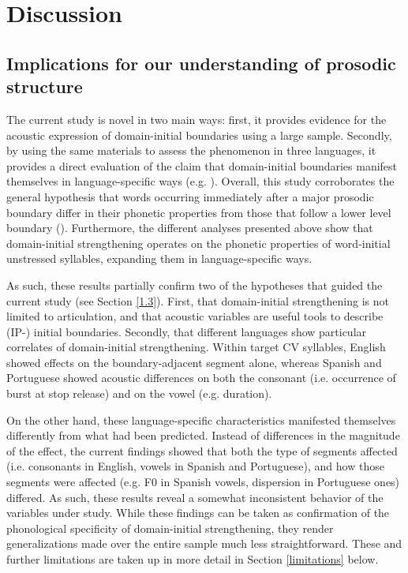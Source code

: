 \documentclass[output=paper]{langscibook}
\begin{document}
\section{Discussion}
\subsection{Implications for our understanding of prosodic structure}
The current study is novel in two main ways: first, it provides evidence for the acoustic expression of domain-initial boundaries using a large sample. Secondly, by using the same materials to assess the phenomenon in three languages, it provides a direct evaluation of the claim that domain-initial boundaries manifest themselves in language-specific ways (e.g. \citealt{cm05}). Overall, this study corroborates the general hypothesis that words occurring immediately after a major prosodic boundary differ in their phonetic properties from those that follow a lower level boundary (\citealt{fk97}). Furthermore, the different analyses presented above show that domain-initial strengthening operates on the phonetic properties of word-initial unstressed syllables, expanding them in language-specific ways. 

As such, these results partially confirm two of the hypotheses that guided the current study (see Section \ref{1.3}). First, that domain-initial strengthening is not limited to articulation, and that acoustic variables are useful tools to describe (IP-) initial boundaries. Secondly, that different languages show particular correlates of domain-initial strengthening. Within target CV syllables, English showed effects on the boundary-adjacent segment alone, whereas Spanish and Portuguese showed acoustic differences on both the consonant (i.e. occurrence of burst at stop release) and on the vowel (e.g. duration).

On the other hand, these language-specific characteristics manifested themselves differently from what had been predicted. Instead of differences in the magnitude of the effect, the current findings showed that both the type of segments affected (i.e. consonants in English, vowels in Spanish and Portuguese), and how those segments were affected (e.g. F0 in Spanish vowels, dispersion in Portuguese ones) differed. As such, these results reveal a somewhat inconsistent behavior of the variables under study. While these findings can be taken as confirmation of the phonological specificity of domain-initial strengthening, they render generalizations made over the entire sample much less straightforward. These and further limitations are taken up in more detail in Section \ref{limitations} below.
\end{document}
